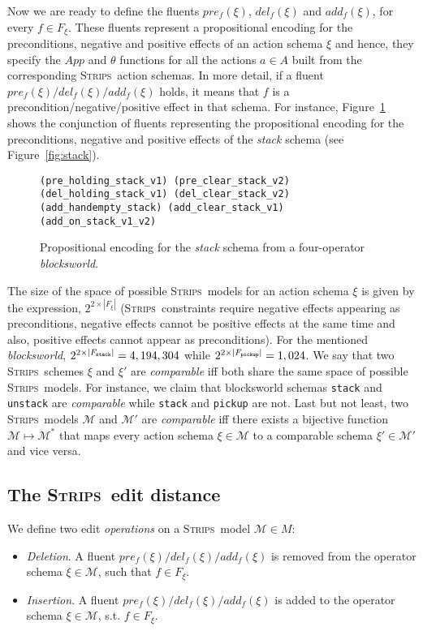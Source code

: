 \documentclass[letterpaper]{article} %
\newcommand{\strips}{\textsc{Strips}}     %
\begin{document}
Now we are ready to define the fluents $pre_f(\xi)$, $del_f(\xi)$ and $add_f(\xi)$, for every $f\in F_{\xi}$. These fluents represent a propositional encoding for the preconditions, negative and positive effects of an action schema $\xi$ and hence, they specify the $App$ and $\theta$ functions for all the actions $a\in A$ built from the corresponding \strips\ action schemas. In more detail, if a fluent $pre_f(\xi)/del_f(\xi)/add_f(\xi)$ holds, it means that $f$ is a precondition/negative/positive effect in that schema. For instance, Figure~\ref{fig:encodedstack} shows the conjunction of fluents representing the propositional encoding for the preconditions, negative and positive effects of the {\em stack} schema (see Figure~\ref{fig:stack}). 

\begin{figure}
\begin{scriptsize}
\begin{verbatim}
(pre_holding_stack_v1) (pre_clear_stack_v2)
(del_holding_stack_v1) (del_clear_stack_v2)
(add_handempty_stack) (add_clear_stack_v1) 
(add_on_stack_v1_v2)
\end{verbatim}
\end{scriptsize}
 \caption{\small Propositional encoding for the {\em stack} schema from a four-operator {\em blocksworld}.}
\label{fig:encodedstack}
\end{figure}

The size of the space of possible \strips\ models for an action schema $\xi$ is given by the expression, $2^{2\times|F_{\xi}|}$ (\strips\ constraints require negative effects appearing as preconditions, negative effects cannot be positive effects at the same time and also, positive effects cannot appear as preconditions). For the mentioned {\em blocksworld}, $2^{2\times|F_{\tt stack}|}=4,194,304$ while $2^{2\times|F_{\tt pickup}|}=1,024$. We say that two \strips\ schemes $\xi$ and $\xi'$ are {\em comparable} iff both share the same space of possible \strips\ models. For instance, we claim that blocksworld schemas {\small\tt stack} and {\small\tt unstack} are {\em comparable} while  {\small\tt stack} and {\small\tt pickup} are not. Last but not least, two \strips\ models $\mathcal{M}$ and $\mathcal{M}'$ are {\em comparable} iff there exists a bijective function $\mathcal{M} \mapsto \mathcal{M}^*$ that maps every action schema $\xi\in\mathcal{M}$ to a comparable schema $\xi'\in\mathcal{M'}$ and vice versa.

\subsection{The \strips\ edit distance}
We define two edit \emph{operations} on a \strips\ model $\mathcal{M}\in M$:
\begin{itemize}
\item {\em Deletion}. A fluent $pre_f(\xi)/del_f(\xi)/add_f(\xi)$ is removed from the operator schema $\xi\in\mathcal{M}$, such that $f\in F_{\xi}$.
\item {\em Insertion}. A fluent $pre_f(\xi)/del_f(\xi)/add_f(\xi)$ is added to the operator schema $\xi\in\mathcal{M}$, s.t. $f\in F_{\xi}$.
\end{itemize}
\end{document}
